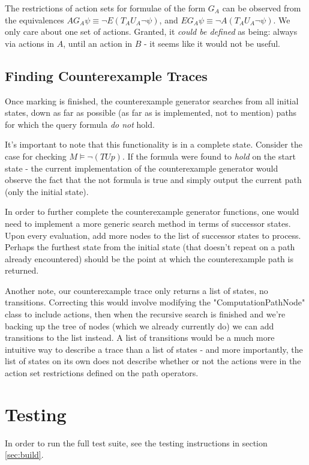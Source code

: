 \documentclass[]{article}
\begin{document}
The restrictions of action sets for formulae of the form $G_A$ can be observed from the equivalences $AG_A \psi \equiv \lnot E (T _AU_A \lnot \psi)$, and $EG_A \psi \equiv \lnot A ( T _AU_A \lnot \psi)$. We only care about one set of actions. Granted, it \emph{could be defined} as being: always via actions in $A$, until an action in $B$ - it seems like it would not be useful.

\subsection{Finding Counterexample Traces}
Once marking is finished, the counterexample generator searches from all initial states, down as far as possible (as far as is implemented, not to mention) paths for which the query formula \emph{do not} hold.

It's important to note that this functionality is in a complete state. Consider the case for checking $M \models \lnot(T U p)$. If the formula were found to \emph{hold} on the start state - the current implementation of the counterexample generator would observe the fact that the not formula is true and simply output the current path (only the initial state).

In order to further complete the counterexample generator functions, one would need to implement a more generic search method in terms of successor states. Upon every evaluation, add more nodes to the list of successor states to process. Perhaps the furthest state from the initial state (that doesn't repeat on a path already encountered) should be the point at which the counterexample path is returned.

Another note, our counterexample trace only returns a list of states, no transitions. Correcting this would involve modifying the "ComputationPathNode" class to include actions, then when the recursive search is finished and we're backing up the tree of nodes (which we already currently do) we can add transitions to the list instead. A list of transitions would be a much more intuitive way to describe a trace than a list of states - and more importantly, the list of states on its own does not describe whether or not the actions were in the action set restrictions defined on the path operators.

\section{Testing}\label{sec:testing}
In order to run the full test suite, see the testing instructions in section \ref{sec:build}.
\end{document}
